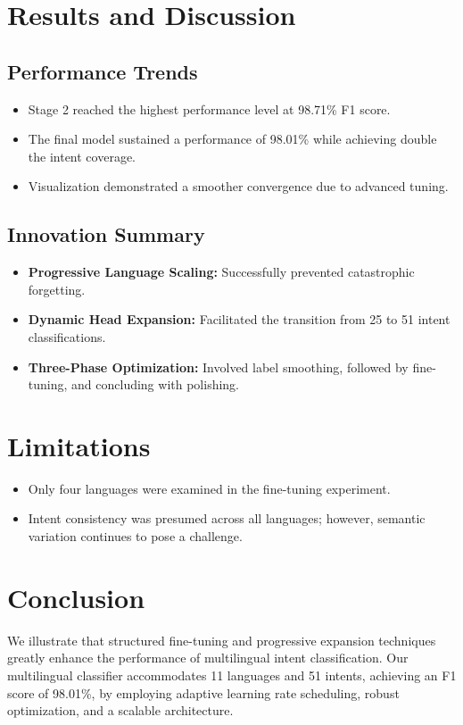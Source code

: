 \documentclass{ecai}
\begin{document}
\section{Results and Discussion}
\subsection{Performance Trends}
\begin{itemize}
    \item Stage 2 reached the highest performance level at 98.71\% F1 score.
    \item The final model sustained a performance of 98.01\% while achieving double the intent coverage.
    \item Visualization demonstrated a smoother convergence due to advanced tuning.
\end{itemize}

\subsection{Innovation Summary}
\begin{itemize}
    \item \textbf{Progressive Language Scaling:} Successfully prevented catastrophic forgetting.
    \item \textbf{Dynamic Head Expansion:} Facilitated the transition from 25 to 51 intent classifications.
    \item \textbf{Three-Phase Optimization:} Involved label smoothing, followed by fine-tuning, and concluding with polishing.
\end{itemize}

\section{Limitations}
\begin{itemize}
    \item Only four languages were examined in the fine-tuning experiment.
    \item Intent consistency was presumed across all languages; however, semantic variation continues to pose a challenge.
\end{itemize}

\section{Conclusion}
We illustrate that structured fine-tuning and progressive expansion techniques greatly enhance the performance of multilingual intent classification. Our multilingual classifier accommodates 11 languages and 51 intents, achieving an F1 score of 98.01\%, by employing adaptive learning rate scheduling, robust optimization, and a scalable architecture.
\end{document}
